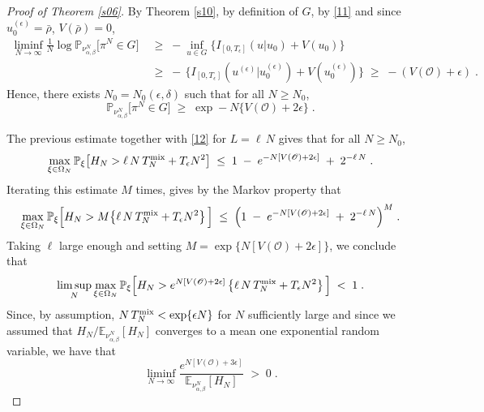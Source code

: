 \documentclass[reqno]{amsart}
\begin{document}
\begin{proof}[Proof of Theorem \ref{s06}]
By Theorem \ref{s10}, by definition of $G$, by \eqref{11} and since
$u^{(\epsilon)}_0 = \bar\rho$, $V(\bar\rho)=0$,
\begin{equation*}
\begin{split}
\liminf_{N\to\infty} \frac 1N \log {{\mathbb P}}_{\nu^N_{\alpha, \beta}} 
\big[ \pi^N \in G\big] \;& \ge\; -\inf_{u\in G} 
\big\{ I_{[0,T_\epsilon]} (u | u_0 ) + V(u_0)\big\} \\
\; & \ge\; - \, \{I_{[0, T_\epsilon]} (u^{(\epsilon)} | u^{(\epsilon)}_0) 
+ V(u^{(\epsilon)}_0) \big\}
\;\ge\; - (V({{\mathscr O}}) + \epsilon)\;.    
\end{split}
\end{equation*}
Hence, there exists $N_0 = N_0(\epsilon, \delta)$ such that for all
$N\ge N_0$,
\begin{equation*}
{{\mathbb P}}_{\nu^N_{\alpha, \beta}} 
\big[ \pi^N \in G\big] \; \ge\; \exp - N 
\big \{ V({{\mathscr O}}) + 2 \epsilon \big\}\;.
\end{equation*}

The previous estimate together with \eqref{12} for $L=\ell\, N$ gives
that for all $N\ge N_0$,
\begin{equation*}
\max_{\xi \in \Omega_N}
{{\mathbb P}}_\xi \big[ H_N > \ell\, N \, T^{\rm mix}_N + T_\epsilon N^2 \big]
\;\le\; 1 \;-\; e^{-N [V({{\mathscr O}}) + 2 \epsilon]} \;+\; 2^{-\ell\, N}\;. 
\end{equation*}
Iterating this estimate $M$ times, gives by the Markov property that
\begin{equation*}
\max_{\xi \in \Omega_N}
{{\mathbb P}}_\xi \Big[ H_N > M \big\{\ell\, N \, T^{\rm mix}_N 
+ T_\epsilon N^2\big\}\, \Big]
\;\le\; \Big(1 \;-\; e^{-N [V({{\mathscr O}}) + 2 \epsilon]} \;+\; 2^{-\ell\,
  N}\Big)^M \;. 
\end{equation*}
Taking $\ell$ large enough and setting $M= \exp\{N [V({{\mathscr O}}) + 2
\epsilon]\}$, we conclude that
\begin{equation*}
\limsup_N \max_{\xi \in \Omega_N}
{{\mathbb P}}_\xi \Big[ H_N >  e^{N [V({{\mathscr O}}) + 2 \epsilon]} \,
\big\{\ell\, N \, T^{\rm mix}_N + T_\epsilon N^2\big\}\, \Big]
\;<\; 1\;. 
\end{equation*}
Since, by assumption, $N \, T^{\rm mix}_N < \exp\{\epsilon N\}$ for
$N$ sufficiently large and since we assumed that $H_N/{{\mathbb E}}_{\nu^N_{\alpha, \beta}}[H_N]$ converges to a mean one exponential
random variable, we have that
\begin{equation*}
\liminf_{N\to\infty} \frac{e^{N [V({{\mathscr O}}) + 3 \epsilon]}}
{{{\mathbb E}}_{\nu^N_{\alpha, \beta}}[H_N]} \;>\; 0\;.
\end{equation*}


\end{proof}
\end{document}
